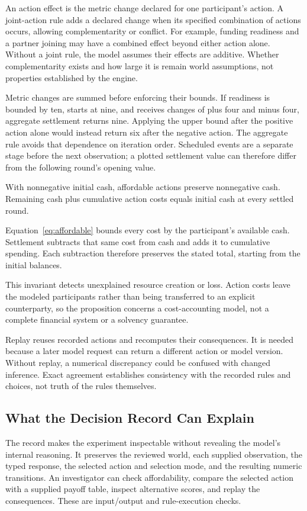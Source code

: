 An action effect is the metric change declared for one participant's action.
A joint-action rule adds a declared change when its specified combination of
actions occurs, allowing complementarity or conflict. For example, funding
readiness and a partner joining may have a combined effect beyond either
action alone. Without a joint rule, the model assumes their effects are
additive. Whether complementarity exists and how large it is remain world
assumptions, not properties established by the engine.

Metric changes are summed before enforcing their bounds. If readiness is
bounded by ten, starts at nine, and receives changes of plus four and minus
four, aggregate settlement returns nine. Applying the upper bound after the
positive action alone would instead return six after the negative action.
The aggregate rule avoids that dependence on iteration order. Scheduled events
are a separate stage before the next observation; a plotted settlement value
can therefore differ from the following round's opening value.

\begin{proposition}
With nonnegative initial cash, affordable actions preserve nonnegative cash.
Remaining cash plus cumulative action costs equals initial cash at every
settled round.
\end{proposition}
\begin{IEEEproof}
Equation~\eqref{eq:affordable} bounds every cost by the participant's available
cash. Settlement subtracts that same cost from cash and adds it to cumulative
spending. Each subtraction therefore preserves the stated total, starting
from the initial balances.
\end{IEEEproof}
This invariant detects unexplained resource creation or loss. Action costs
leave the modeled participants rather than being transferred to an explicit
counterparty, so the proposition concerns a cost-accounting model, not a
complete financial system or a solvency guarantee.

Replay reuses recorded actions and recomputes their consequences. It is
needed because a later model request can return a different action or model
version. Without replay, a numerical discrepancy could be confused with
changed inference. Exact agreement establishes consistency with the recorded
rules and choices, not truth of the rules themselves.

\subsection{What the Decision Record Can Explain}\label{sec:record-scope}
The record makes the experiment inspectable without revealing the model's
internal reasoning. It preserves the reviewed world, each supplied observation,
the typed response, the selected action and selection mode, and the resulting
numeric transitions. An investigator can check affordability, compare the
selected action with a supplied payoff table, inspect alternative scores,
and replay the consequences. These are input/output and rule-execution checks.

